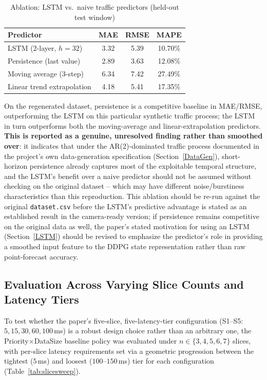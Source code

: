 \documentclass[10pt,journal,compsoc]{IEEEtran}
\begin{document}
\begin{table}[!t]
\centering
\caption{Ablation: LSTM vs.\ naive traffic predictors (held-out test window)}
\label{tab:ablation}
\begin{tabular}{|l|c|c|c|}
\hline
\textbf{Predictor} & \textbf{MAE} & \textbf{RMSE} & \textbf{MAPE} \\
\hline
LSTM (2-layer, $h=32$) & 3.32 & 5.39 & 10.70\% \\
\hline
Persistence (last value) & 2.89 & 3.63 & 12.08\% \\
\hline
Moving average (3-step) & 6.34 & 7.42 & 27.49\% \\
\hline
Linear trend extrapolation & 4.18 & 5.41 & 17.35\% \\
\hline
\end{tabular}
\end{table}
 
On the regenerated dataset, persistence is a competitive baseline in MAE/RMSE,
outperforming the LSTM on this particular synthetic traffic process; the LSTM
in turn outperforms both the moving-average and linear-extrapolation
predictors. \textbf{This is reported as a genuine, unresolved finding rather
than smoothed over}: it indicates that under the AR(2)-dominated traffic
process documented in the project's own data-generation specification
(Section~\ref{DataGen}), short-horizon persistence already captures most of
the exploitable temporal structure, and the LSTM's benefit over a naive
predictor should not be assumed without checking on the original dataset --
which may have different noise/burstiness characteristics than this
reproduction. This ablation should be re-run against the original
\texttt{dataset.csv} before the LSTM's predictive advantage is stated as an
established result in the camera-ready version; if persistence remains
competitive on the original data as well, the paper's stated motivation for
using an LSTM (Section~\ref{LSTM}) should be revised to emphasize the
predictor's role in providing a smoothed input feature to the DDPG state
representation rather than raw point-forecast accuracy.
 
\subsection{Evaluation Across Varying Slice Counts and Latency Tiers}
\label{SliceSweep}
 
To test whether the paper's five-slice, five-latency-tier configuration
(S1--S5: $5,15,30,60,100$\,ms) is a robust design choice rather than an
arbitrary one, the Priority$\times$DataSize baseline policy was evaluated
under $n\in\{3,4,5,6,7\}$ slices, with per-slice latency requirements set
via a geometric progression between the tightest ($5$\,ms) and loosest
($100$--$150$\,ms) tier for each configuration (Table~\ref{tab:slicesweep}).
 
\end{document}

